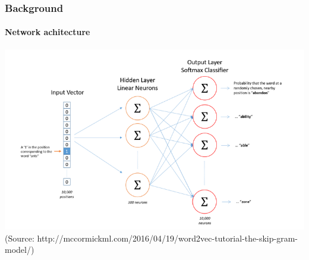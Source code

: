 \begin{frame}\frametitle{Background}\framesubtitle{Network achitecture}
\includegraphics[scale=0.37]{images/ntw_architecture.png}
(Source: http://mccormickml.com/2016/04/19/word2vec-tutorial-the-skip-gram-model/) 
\end{frame}


